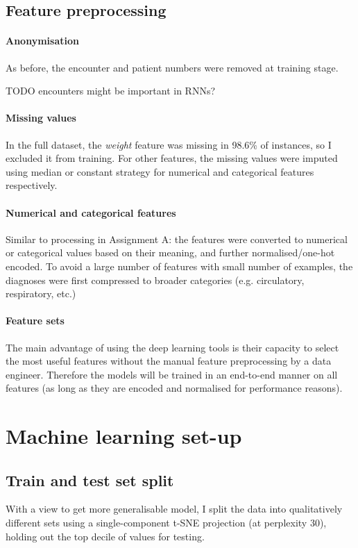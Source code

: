 \documentclass[10pt, twocolumn]{article}
\begin{document}
\subsection{Feature preprocessing}
\paragraph{Anonymisation} As before, the encounter and patient numbers were removed at training stage.

TODO encounters might be important in RNNs?

\paragraph{Missing values} In the full dataset, the \textit{weight} feature was missing in 98.6\% of instances, so I excluded it from training. For other features, the missing values were imputed using median or constant strategy for numerical and categorical features respectively.

\paragraph{Numerical and categorical features} Similar to processing in Assignment A: the features were converted to numerical or categorical values based on their meaning, and further normalised/one-hot encoded. To avoid a large number of features with small number of examples, the diagnoses were first compressed to broader categories (e.g. circulatory, respiratory, etc.)

\paragraph{Feature sets} The main advantage of using the deep learning tools is their capacity to select the most useful features without the manual feature preprocessing by a data engineer. Therefore the models will be trained in an end-to-end manner on all features (as long as they are encoded and normalised for performance reasons).

\section{Machine learning set-up}

\subsection{Train and test set split}
With a view to get more generalisable model, I split the data into qualitatively different sets using a single-component t-SNE projection (at perplexity 30), holding out the top decile of values for testing. 
\end{document}
